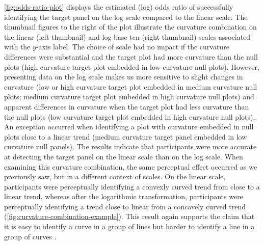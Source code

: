 \documentclass[12pt]{article}
\begin{document}
\cref{fig:odds-ratio-plot} displays the estimated (log) odds ratio of
successfully identifying the target panel on the log scale compared to
the linear scale. The thumbnail figures to the right of the plot
illustrate the curvature combination on the linear (left thumbnail) and
log base ten (right thumbnail) scales associated with the \(y\)-axis
label. The choice of scale had no impact if the curvature differences
were substantial and the target plot had more curvature than the null
plots (high curvature target plot embedded in low curvature null plots).
However, presenting data on the log scale makes us more sensitive to
slight changes in curvature (low or high curvature target plot embedded
in medium curvature null plots; medium curvature target plot embedded in
high curvature null plots) and apparent differences in curvature when
the target plot had less curvature than the null plots (low curvature
target plot embedded in high curvature null plots). An exception
occurred when identifying a plot with curvature embedded in null plots
close to a linear trend (medium curvature target panel embedded in low
curvature null panels). The results indicate that participants were more
accurate at detecting the target panel on the linear scale than on the
log scale. When examining this curvature combination, the same
perceptual effect occurred as we previously saw, but in a different
context of scales. On the linear scale, participants were perceptually
identifying a convexly curved trend from close to a linear trend,
whereas after the logarithmic transformation, participants were
perceptually identifying a trend close to linear from a concavely curved
trend (\cref{fig:curvature-combination-example}). This result again
supports the claim that it is easy to identify a curve in a group of
lines but harder to identify a line in a group of curves
\citep{best_perception_2007}.
\end{document}
